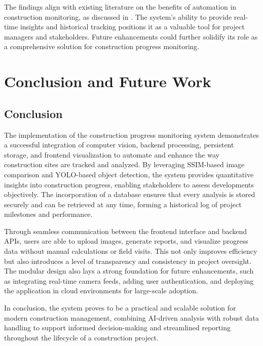 \documentclass[12pt,a4paper]{report}
\begin{document}
The findings align with existing literature on the benefits of automation in construction monitoring, as discussed in \cite{Sample2023}. The system's ability to provide real-time insights and historical tracking positions it as a valuable tool for project managers and stakeholders. Future enhancements could further solidify its role as a comprehensive solution for construction progress monitoring.

\chapter{Conclusion and Future Work}

\section{Conclusion}
The implementation of the construction progress monitoring system demonstrates a successful integration of computer vision, backend processing, persistent storage, and frontend visualization to automate and enhance the way construction sites are tracked and analyzed. By leveraging SSIM-based image comparison and YOLO-based object detection, the system provides quantitative insights into construction progress, enabling stakeholders to assess developments objectively. The incorporation of a database ensures that every analysis is stored securely and can be retrieved at any time, forming a historical log of project milestones and performance.

Through seamless communication between the frontend interface and backend APIs, users are able to upload images, generate reports, and visualize progress data without manual calculations or field visits. This not only improves efficiency but also introduces a level of transparency and consistency in project oversight. The modular design also lays a strong foundation for future enhancements, such as integrating real-time camera feeds, adding user authentication, and deploying the application in cloud environments for large-scale adoption.

In conclusion, the system proves to be a practical and scalable solution for modern construction management, combining AI-driven analysis with robust data handling to support informed decision-making and streamlined reporting throughout the lifecycle of a construction project.
\end{document}
